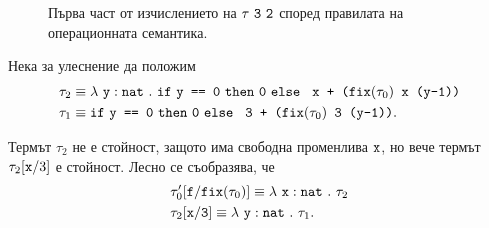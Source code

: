 \begin{landscape}
\begin{framed}
  \begin{figure}[H]
    \begin{prooftree}
    \end{prooftree}
    \caption{Първа част от изчислението на $\tau\ \vv{3}\ \vv{2}$ според правилата на операционната семантика.}
    \label{fig:operational-cbn-example:first-part}
  \end{figure}
\end{framed}

Нека за улеснение да положим
\begin{align*}
  \tau_2 & \equiv \lamb{y}{nat}{\ifelse{\vv{y == 0}}{\vv{0}}{\vv{ x + (}\fix(\tau_0)\vv{ x (y-1))}}}\\
  \tau_1 & \equiv \ifelse{\vv{y == 0}}{\vv{0}}{\vv{ 3 + (}\fix(\tau_0)\vv{ 3 (y-1))}}.
\end{align*}

Термът $\tau_2$ не е стойност, защото има свободна променлива $\vv{x}$, но вече термът $\tau_2\subst{x}{3}$ е стойност. Лесно се съобразява, че
\begin{align*}
  & \tau'_0\subst{f}{\fix(\tau_0)} \equiv \lamb{x}{nat}{\tau_2}\\
  & \tau_2 \substConst{x}{3} \equiv \lamb{y}{nat}{\tau_1}.
\end{align*}


\end{landscape}
